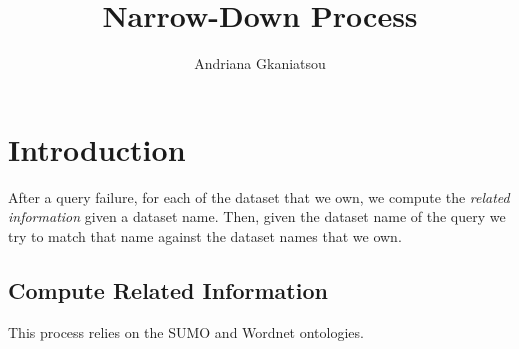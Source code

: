 \documentclass[a4paper,10pt]{article}
\title{Narrow-Down Process}
\author{Andriana Gkaniatsou}
\begin{document}
\maketitle





\section{Introduction}

After a query failure, for each of the dataset that we own, we compute the \textit{related information} given a dataset name. 	Then, given
 the dataset name of the query we try to match that name against the dataset names that we own.


\subsection{Compute Related Information}
This process relies 
on the SUMO and Wordnet ontologies. 
%
%	    


\end{document}

